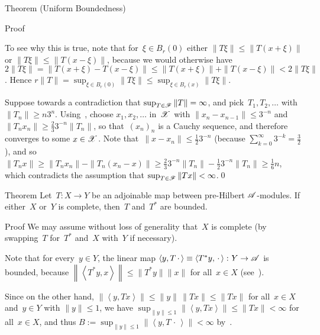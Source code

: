 \documentclass[a]{subfiles}
\begin{document}
\begin{parsec}
\begin{point}[pub]{Theorem (Uniform Boundedness)}
\begin{point}{Proof}
\begin{point}
To see why this is true,
note that for~$\xi\in B_r(0)$
either $\|T\xi\|\leq \|T(x+\xi)\|$
or $\|T\xi\|\leq \|T(x-\xi)\|$,
because we would otherwise have
$2\|T\xi\| = \|T(x+\xi)-T(x-\xi)\|
\leq \|T(x+\xi)\|+\|T(x-\xi)\|<2\|T\xi\|$.
Hence
$r\|T\|=\sup_{\xi\in B_r(0)} \|T\xi\|\leq  
\sup_{\xi \in B_r(x)} \|T\xi \|$.
\end{point}
\begin{point}%
Suppose towards a contradiction
that $\sup_{T\in\mathscr{F}}\|T\|=\infty$,
and pick~$T_1,T_2,\dotsc$ with $\|T_n\|\geq n3^{n}$.
Using~,
choose $x_1,x_2,\dotsc$ in~$\mathscr{X}$
with $\|x_{n}-x_{n-1}\|\leq 3^{-n}$
and~$\|T_{n} x_{n}\|\geq \frac{2}{3}3^{-n}\|T_{n}\|$,
so that~$(x_n)_n$ is a Cauchy sequence, 
and therefore converges to some
$x\in\mathscr{X}$.
Note that~$\|x-x_n\|\leq \frac{1}{2}3^{-n}$
(because $\sum_{k=0}^\infty 3^{-k}=\frac{3}{2}$),
and so $\|T_n x\|\geq  \|T_nx_n\| - \|T_n(x_n-x)\|
\geq \frac{2}{3}3^{-n}\|T_n\|-\frac{1}{2}3^{-n}\|T_n\|
\geq \frac{1}{6}n$,
which contradicts
the assumption that $\sup_{T\in \mathscr{F}} \|Tx\| <\infty$.\qed
\end{point}
\end{point}
\end{point}
\begin{point}{Theorem}%
Let~$T\colon X\to Y$ be an adjoinable map
between pre-Hilbert $\mathscr{A}$-modules.
If either~$X$ or~$Y$ is complete,
then~$T$ and~$T^*$ are bounded.
\begin{point}{Proof}%
We may assume without loss of generality
that~$X$ is complete (by swapping~$T$ for~$T^*$
and~$X$ with~$Y$ if necessary).

Note that for every~$y\in Y$,
the linear map $\left<y,T\,\cdot\,\right>\equiv
\left<T^*y,\,\cdot\,\right>\colon Y\to \mathscr{A}$
is bounded,
because $\left\|\left<T^*y,x\right>\right\| \leq \|T^*y\|\|x\|$
for all~$x\in X$ (see~).

Since 
on the other hand,
$\left\|\left<y,Tx\right>\right\|
\leq \|y\|\,\|Tx\|\leq \|Tx\|$
for all~$x\in X$ and~$y\in Y$ with $\|y\|\leq 1$,
we have $\sup_{\|y\|\leq 1} \|\left<y,Tx\right>\| \leq \|Tx\|<\infty$
for all~$x\in X$,
and thus $B:=\sup_{\|y\|\leq 1} \|\left<y,T\,\cdot\,\right>\|<\infty$
by~.


\end{point}
\end{point}
\end{parsec}
\end{document}

